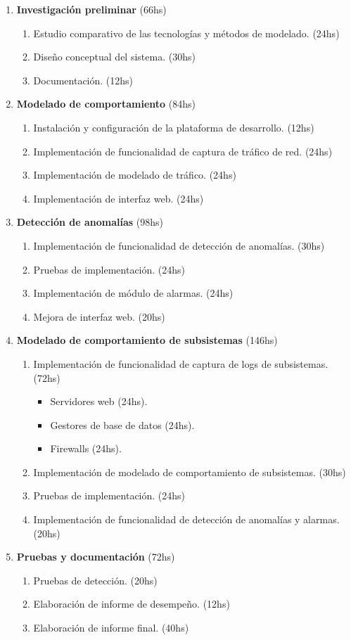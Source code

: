\begin{enumerate}
	\setlength{\itemsep}{0pt}
	\setlength{\parskip}{0pt}
	\item \textbf{Investigación preliminar} (66hs)
	\begin{enumerate}
		\item Estudio comparativo de las tecnologías y métodos de modelado. (24hs)
		\item Diseño conceptual del sistema. (30hs)
		\item Documentación. (12hs)
	\end{enumerate}
	\item \textbf{Modelado de comportamiento} (84hs)
	\begin{enumerate}
		\item Instalación y configuración de la plataforma de desarrollo. (12hs)
		\item Implementación de funcionalidad de captura de tráfico de red. (24hs)
		\item Implementación de modelado de tráfico. (24hs)
		\item Implementación de interfaz web. (24hs)
	\end{enumerate}
	\item \textbf{Detección de anomalías} (98hs)
	\begin{enumerate}
		\item Implementación de funcionalidad de detección de anomalías. (30hs)
		\item Pruebas de implementación. (24hs)
		\item Implementación de módulo de alarmas. (24hs)
		\item Mejora de interfaz web. (20hs)
	\end{enumerate}
	\newpage
	\item \textbf{Modelado de comportamiento de subsistemas} (146hs)
	\begin{enumerate}
		\item Implementación de funcionalidad de captura de logs de subsistemas. (72hs)
		\begin{itemize}
			\item Servidores web (24hs).
			\item Gestores de base de datos (24hs).
			\item Firewalls (24hs).
		\end{itemize}
		\item Implementación de modelado de comportamiento de subsistemas. (30hs)
		\item Pruebas de implementación. (24hs)
		\item Implementación de funcionalidad de detección de anomalías y alarmas. (20hs)
	\end{enumerate}
	\item \textbf{Pruebas y documentación} (72hs)
	\begin{enumerate}
		\item Pruebas de detección. (20hs)
		\item Elaboración de informe de desempeño. (12hs)
		\item Elaboración de informe final. (40hs)
	\end{enumerate}
\end{enumerate}

